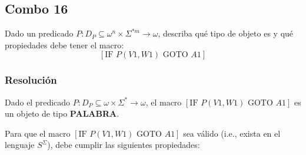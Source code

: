 \documentclass[
]{article}
\begin{document}
\subsection{Combo 16}\label{combo-16}

Dado un predicado \(P:D_P\subseteq\omega^n\times\Sigma^{*m}\to\omega\),
describa qué tipo de objeto es y qué propiedades debe tener el macro:
\[[\text{IF }P(V1,W1)\text{ GOTO }A1]\]

\subsubsection{Resolución}\label{resoluciuxf3n-15}

Dado el predicado \(P:D_P\subseteq\omega\times\Sigma^*\to\omega\), el
macro \([\text{IF }P(V1,W1)\text{ GOTO }A1]\) es un objeto de tipo
\textbf{PALABRA}.

Para que el macro \([\text{IF }P(V1,W1)\text{ GOTO }A1]\) sea válido
(i.e., exista en el lenguaje \(S^\Sigma\)), debe cumplir las siguientes
propiedades:
\end{document}
